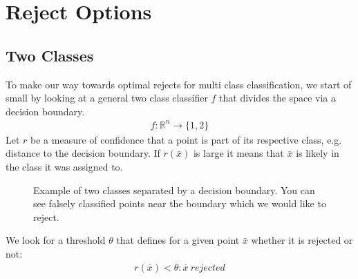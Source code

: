 %
\chapter{Reject Options}
\label{sec:options}

\section{Two Classes}
\label{twoclasses}
To make our way towards optimal rejects for multi class classification, we start of small by looking at a general two class classifier $f$ that divides the space via a decision boundary. 
\begin{align}
f: \mathbb{R}^n \to \{1,2\}
\end{align} 
Let $r$ be a measure of confidence that a point is part of its respective class, e.g. distance to the decision boundary. If $r(\bar{x})$ is large it means that $\bar{x}$ is likely in the class it was assigned to.

\begin{figure}[!htbp]
\centering
\caption{Example of two classes separated by a decision boundary. You can see falsely classified points near the boundary which we would like to reject.}
\label{decBound}
\end{figure}

We look for a threshold $\theta$ that defines for a given point $\bar{x}$ whether it is rejected or not:
 \begin{align}
 r(\bar{x}) < \theta : \bar{x} \  rejected 
 \end{align}

